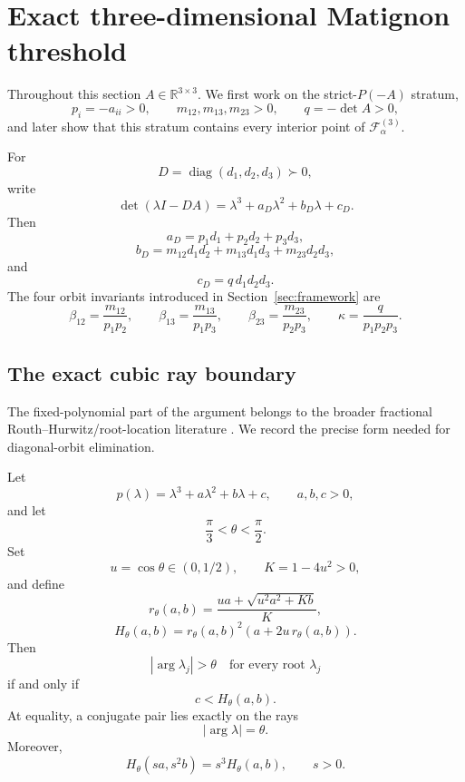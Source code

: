 \section{Exact three-dimensional Matignon threshold}
\label{sec:exact-3x3}

Throughout this section \(A\in\mathbb R^{3\times3}\). We first work on the strict-\(P(-A)\) stratum,
\[
p_i=-a_{ii}>0,
\qquad
m_{12},m_{13},m_{23}>0,
\qquad
q=-\det A>0,
\]
and later show that this stratum contains every interior point of \(\mathcal F_\alpha^{(3)}\).

For
\[
D=\operatorname{diag}(d_1,d_2,d_3)\succ0,
\]
write
\[
\det(\lambda I-DA)
=
\lambda^3+a_D\lambda^2+b_D\lambda+c_D.
\]
Then
\[
a_D=p_1d_1+p_2d_2+p_3d_3,
\]
\[
b_D
=
m_{12}d_1d_2
+
m_{13}d_1d_3
+
m_{23}d_2d_3,
\]
and
\[
c_D=q\,d_1d_2d_3.
\]
The four orbit invariants introduced in Section~\ref{sec:framework} are
\[
\beta_{12}=\frac{m_{12}}{p_1p_2},
\qquad
\beta_{13}=\frac{m_{13}}{p_1p_3},
\qquad
\beta_{23}=\frac{m_{23}}{p_2p_3},
\qquad
\kappa=\frac{q}{p_1p_2p_3}.
\]

\subsection{The exact cubic ray boundary}

The fixed-polynomial part of the argument belongs to the broader fractional Routh--Hurwitz/root-location literature \citep{CermakNechvatal2017,Bourafa2020}. We record the precise form needed for diagonal-orbit elimination.

\begin{lemma}
\label{lem:cubic-boundary}
Let
\[
p(\lambda)=\lambda^3+a\lambda^2+b\lambda+c,
\qquad
a,b,c>0,
\]
and let
\[
\frac{\pi}{3}<\theta<\frac{\pi}{2}.
\]
Set
\[
u=\cos\theta\in(0,1/2),
\qquad
K=1-4u^2>0,
\]
and define
\[
r_\theta(a,b)
=
\frac{ua+\sqrt{u^2a^2+Kb}}{K},
\]
\[
H_\theta(a,b)
=
r_\theta(a,b)^2
\left(
a+2u\,r_\theta(a,b)
\right).
\]
Then
\[
|\arg\lambda_j|>\theta
\quad\text{for every root }\lambda_j
\]
if and only if
\[
c<H_\theta(a,b).
\]
At equality, a conjugate pair lies exactly on the rays
\[
|\arg\lambda|=\theta.
\]
Moreover,
\[
H_\theta(sa,s^2b)=s^3H_\theta(a,b),
\qquad
s>0.
\]
\end{lemma}

